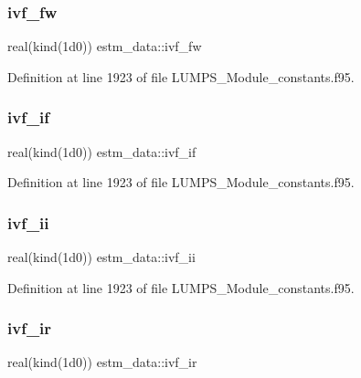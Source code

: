 \subsubsection{\texorpdfstring{ivf\+\_\+fw}{ivf\_fw}}
{\footnotesize\ttfamily real(kind(1d0)) estm\+\_\+data\+::ivf\+\_\+fw}



Definition at line 1923 of file L\+U\+M\+P\+S\+\_\+\+Module\+\_\+constants.\+f95.

\mbox{\label{namespaceestm__data_aa4a8abb93e606a189276a500f27cd503}} 
\subsubsection{\texorpdfstring{ivf\+\_\+if}{ivf\_if}}
{\footnotesize\ttfamily real(kind(1d0)) estm\+\_\+data\+::ivf\+\_\+if}



Definition at line 1923 of file L\+U\+M\+P\+S\+\_\+\+Module\+\_\+constants.\+f95.

\mbox{\label{namespaceestm__data_a1143a11453932046e1418817b274ca99}} 
\subsubsection{\texorpdfstring{ivf\+\_\+ii}{ivf\_ii}}
{\footnotesize\ttfamily real(kind(1d0)) estm\+\_\+data\+::ivf\+\_\+ii}



Definition at line 1923 of file L\+U\+M\+P\+S\+\_\+\+Module\+\_\+constants.\+f95.

\mbox{\label{namespaceestm__data_ab659d135eedc3bab580f60e45e10ea7c}} 
\subsubsection{\texorpdfstring{ivf\+\_\+ir}{ivf\_ir}}
{\footnotesize\ttfamily real(kind(1d0)) estm\+\_\+data\+::ivf\+\_\+ir}




